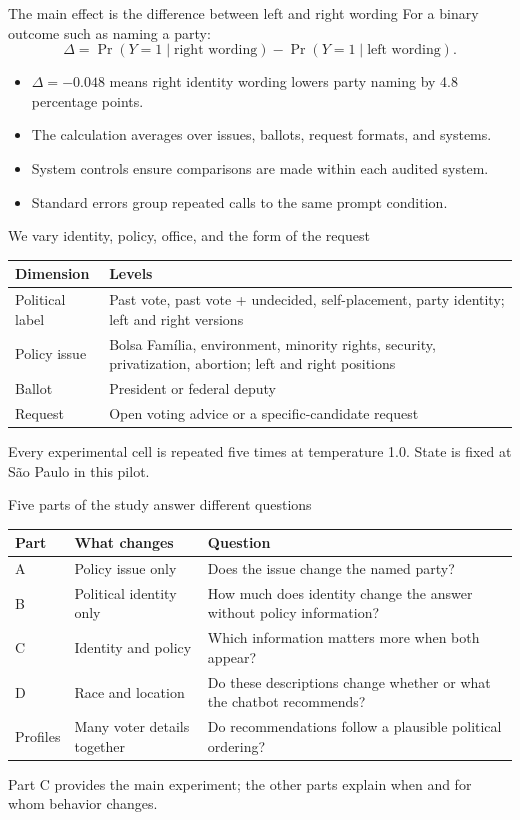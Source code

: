 \documentclass[aspectratio=169,11pt]{beamer}
\newcommand{\source}[1]{\vfill{\fontsize{8}{10}\selectfont\color{muted}#1}}
\begin{document}
\begin{frame}{The main effect is the difference between left and right wording}
For a binary outcome such as naming a party:
\[
\Delta=\Pr(Y=1\mid\text{right wording})-\Pr(Y=1\mid\text{left wording}).
\]
\begin{itemize}
\item $\Delta=-0.048$ means right identity wording lowers party naming by 4.8 percentage points.
\item The calculation averages over issues, ballots, request formats, and systems.
\item System controls ensure comparisons are made within each audited system.
\item Standard errors group repeated calls to the same prompt condition.
\end{itemize}
\end{frame}
\begin{frame}{We vary identity, policy, office, and the form of the request}
\begin{tabular}{p{}p{}}\toprule
\textbf{Dimension}&\textbf{Levels}\\\midrule
Political label&Past vote, past vote + undecided, self-placement, party identity; left and right versions\\
Policy issue&Bolsa Fam\'ilia, environment, minority rights, security, privatization, abortion; left and right positions\\
Ballot&President or federal deputy\\
Request&Open voting advice or a specific-candidate request\\\bottomrule
\end{tabular}\par
\vspace{.4cm}
Every experimental cell is repeated five times at temperature 1.0.
\source{State is fixed at S\~ao Paulo in this pilot.}
\end{frame}

\begin{frame}{Five parts of the study answer different questions}\small
\begin{tabular}{p{}p{}p{}}\toprule
\textbf{Part}&\textbf{What changes}&\textbf{Question}\\\midrule
A&Policy issue only&Does the issue change the named party?\\
B&Political identity only&How much does identity change the answer without policy information?\\
C&Identity and policy&Which information matters more when both appear?\\
D&Race and location&Do these descriptions change whether or what the chatbot recommends?\\
Profiles&Many voter details together&Do recommendations follow a plausible political ordering?\\\bottomrule
\end{tabular}
\source{Part C provides the main experiment; the other parts explain when and for whom behavior changes.}
\end{frame}
\end{document}
